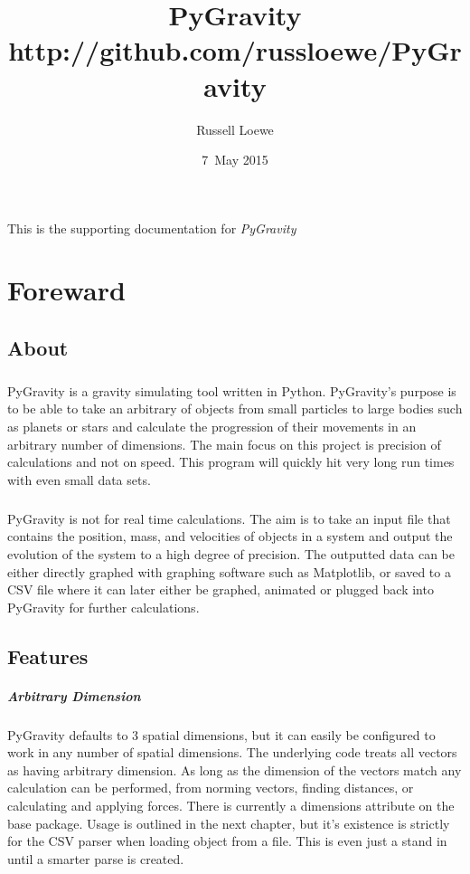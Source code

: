 \documentclass[15pt]{report}
\title{PyGravity \\
		\small http://github.com/russloewe/PyGravity}
\author{Russell Loewe}
\date{7~May 2015}
\begin{document}
\maketitle

\indent
This is the supporting documentation for
\textit{PyGravity} 

\tableofcontents

\newpage
\chapter{Foreward}

\section{About}

\paragraph{}PyGravity is a gravity simulating tool written in Python. PyGravity's purpose is to be able to take an arbitrary 
of objects  from small particles to large bodies such as planets or stars and calculate the progression of their movements 
in an arbitrary number of dimensions. The main focus on this project is precision of calculations and not on speed. This program 
will quickly hit very long run times with even small data sets. 
\paragraph{}PyGravity is not for real time calculations. The aim is to take an input file that contains the position, mass, and 
velocities of objects in a system and output the evolution of the system to a high degree of precision. The outputted data can be 
either directly graphed with graphing software such as Matplotlib, or saved to a CSV file where it can later either be graphed, 
animated or plugged back into PyGravity for further calculations.

\section{Features}
\paragraph{Arbitrary Dimension} PyGravity defaults to 3 spatial dimensions, but it can easily be configured to work in any 
number of spatial dimensions. The underlying code treats all vectors as having arbitrary dimension. As long as the dimension 
of the vectors match any calculation can be performed, from norming vectors, finding distances, or calculating and applying forces. 
There is currently a dimensions attribute on the base package. Usage is outlined in the next chapter, but it's existence is 
strictly for the CSV parser when loading object from a file. This is even just a stand in until a smarter parse is created.
\end{document}
